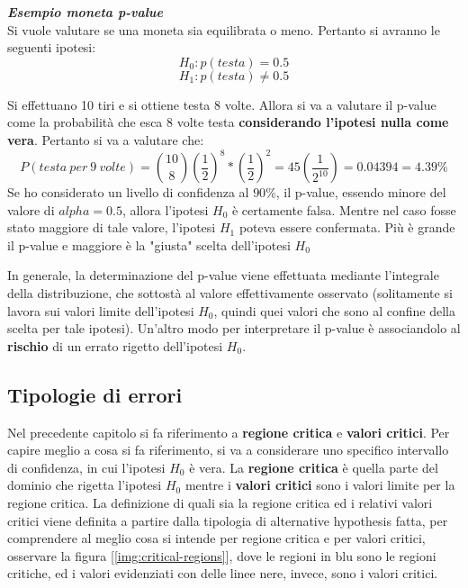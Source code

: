 \begin{info}
\textbf{\textit{Esempio moneta p-value}}\\
Si vuole valutare se una moneta sia equilibrata o meno. Pertanto si avranno le seguenti ipotesi:
\[
H_0: p(testa) = 0.5
\]
\[
H_1: p(testa) \not = 0.5
\]

Si effettuano 10 tiri e si ottiene testa 8 volte.
Allora si va a valutare il p-value come la probabilità che esca 8 volte testa \textbf{considerando l'ipotesi nulla come vera}. Pertanto si va a valutare che:
\[
P(testa\ per\ 9\ volte) = \binom{10}{8}\left (\frac{1}{2} \right )^8 * \left (\frac{1}{2} \right )^2 = 45\left (\frac{1}{2^10} \right ) = 0.04394 = 4.39\%
\]
Se ho considerato un livello di confidenza al \(90 \%\), il p-value, essendo minore del valore di \(alpha = 0.5\), allora l'ipotesi \(H_0\) è certamente falsa. Mentre nel caso fosse stato maggiore di tale valore, l'ipotesi \(H_1\) poteva essere confermata. Più è grande il p-value e maggiore è la "giusta" scelta dell'ipotesi \(H_0\)
\end{info}

In generale, la determinazione del p-value viene effettuata mediante l'integrale della distribuzione, che sottostà al valore effettivamente osservato (solitamente si lavora sui valori limite dell'ipotesi \(H_0\), quindi quei valori che sono al confine della scelta per tale ipotesi). 
Un'altro modo per interpretare il p-value è associandolo al \textbf{rischio} di un errato rigetto dell'ipotesi \(H_0\).

\subsection{Tipologie di errori}
Nel precedente capitolo si fa riferimento a \textbf{regione critica} e \textbf{valori critici}. Per capire meglio a cosa si fa riferimento, si va a considerare uno specifico intervallo di confidenza, in cui l'ipotesi \(H_0\) è vera. La \textbf{regione critica} è quella parte del dominio che rigetta l'ipotesi \(H_0\) mentre i \textbf{valori critici} sono i valori limite per la regione critica. La definizione di quali sia la regione critica ed i relativi valori critici viene definita a partire dalla tipologia di alternative hypothesis fatta, per comprendere al meglio cosa si intende per regione critica e per valori critici, osservare la figura [\ref{img:critical-regions}], dove le regioni in blu sono le regioni critiche, ed i valori evidenziati con delle linee nere, invece, sono i valori critici.

